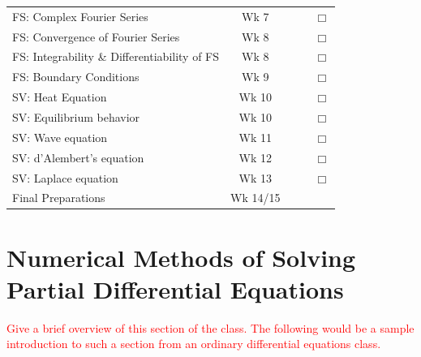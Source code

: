 \documentclass{article}
\newcommand{\red}[1]{\textcolor{red}{#1}}
\begin{document}
\begin{tabular}{|l|c|c|c|c}
\multirow{2}{5cm}{FS: Complex Fourier Series} & \multirow{2}{1.5cm}{Wk 7} &&& \multirow{2}{.4cm}{$\Box$} \\ &&&& \\ \cline{1-4}
\multirow{2}{7cm}{FS: Convergence of Fourier Series} & \multirow{2}{1.5cm}{Wk 8} &&& \multirow{2}{.4cm}{$\Box$} \\ &&&& \\  \cline{1-4}
\multirow{2}{7cm}{FS: Integrability \& Differentiability of FS} & \multirow{2}{1.5cm}{Wk 8} &&& \multirow{2}{.4cm}{$\Box$} \\ &&&& \\  \cline{1-4}
\multirow{2}{5cm}{FS: Boundary Conditions} & \multirow{2}{1.5cm}{Wk 9} &&& \multirow{2}{.4cm}{$\Box$} \\ &&&& \\ \cline{1-4}
\multirow{2}{5cm}{SV: Heat Equation} & \multirow{2}{1.5cm}{Wk 10} &&& \multirow{2}{.4cm}{$\Box$} \\ &&&& \\ \cline{1-4}
\multirow{2}{5cm}{SV: Equilibrium behavior} & \multirow{2}{1.5cm}{Wk 10} &&& \multirow{2}{.4cm}{$\Box$} \\ &&&& \\ \cline{1-4}
\multirow{2}{5cm}{SV: Wave equation} & \multirow{2}{1.5cm}{Wk 11} &&& \multirow{2}{.4cm}{$\Box$} \\ &&&& \\ \cline{1-4}
\multirow{2}{5cm}{SV: d'Alembert's equation} & \multirow{2}{1.5cm}{Wk 12} &&& \multirow{2}{.4cm}{$\Box$} \\ &&&& \\ \cline{1-4}
\multirow{2}{5cm}{SV: Laplace equation} & \multirow{2}{1.5cm}{Wk 13} &&& \multirow{2}{.4cm}{$\Box$} \\ &&&& \\ \cline{1-4}
\multirow{2}{5cm}{Final Preparations} & \multirow{2}{1.8cm}{Wk 14/15} &&&   \\&&&& \\ \cline{1-4}
\end{tabular}
\newpage

\section{Numerical Methods of Solving Partial Differential Equations}
\red{Give a brief overview of this section of the class. The following would be a sample introduction to such a section from an ordinary differential equations class.}
\end{document}

